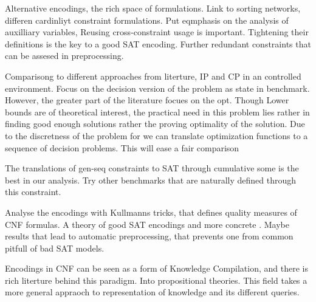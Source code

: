 \documentclass[]{llncs}
\begin{document}
Alternative encodings, the rich space of formulations. Link to sorting networks, differen cardinliyt constraint
formulations. Put eqmphasis on the analysis of auxilliary variables, Reusing cross-constraint usage is important.
Tightening their definitions is the key to a good SAT encoding. Further redundant constraints that can be assesed in
preprocessing. 

Comparisong to different approaches from literture, IP and CP in an controlled environment. Focus on the decision
version of the problem as state in benchmark. However, the greater part of the literature focues on the opt. Though
Lower bounds are of theoretical interest, the practical need in this problem lies rather in finding good enough
solutions rather the proving optimality of the solution. Due to the discretness of the problem for we can translate
optimization functions to a sequence of decision problems. This will ease a fair comparison 

The translations of gen-seq constraints to SAT through cumulative some is the best in our analysis. Try other benchmarks
that are naturally defined through this constraint. 

Analyse the encodings with Kullmanns tricks, that defines quality measures of CNF formulas. A theory of good SAT
encodings and more concrete . Maybe results that lead to automatic preprocessing, that prevents one from common pitfull
of bad SAT models. 

Encodings in CNF can be seen as a form of Knowledge Compilation, and there is rich literture behind this paradigm. Into
propositional theories. This field takes a more general appraoch to representation of knowledge and its different
queries. 



\end{document}
